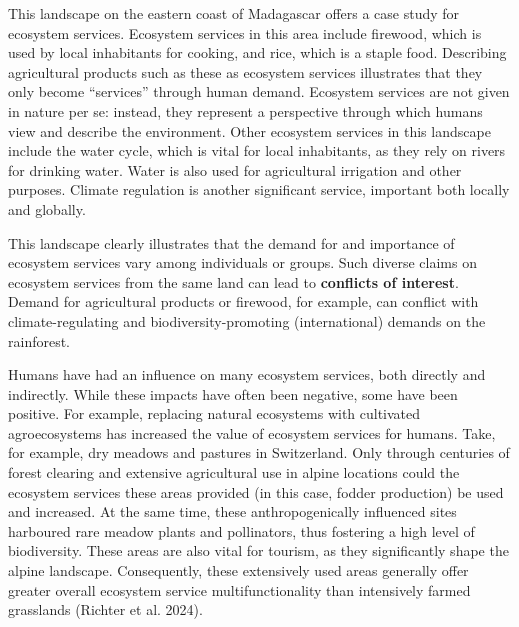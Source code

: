 \documentclass[
  a4paper,
  openany]{book}
\begin{document}
\begin{tcolorbox}[enhanced jigsaw, coltitle=black, bottomtitle=1mm, opacitybacktitle=0.6, titlerule=0mm, opacityback=0, leftrule=.75mm, colbacktitle=quarto-callout-tip-color!10!white, bottomrule=.15mm, toptitle=1mm, breakable, title={Case study: Ecosystem services in Madagascar}, arc=.35mm, rightrule=.15mm, toprule=.15mm, left=2mm, colback=white, colframe=quarto-callout-tip-color-frame]

This landscape on the eastern coast of Madagascar offers a case study
for ecosystem services. Ecosystem services in this area include
firewood, which is used by local inhabitants for cooking, and rice,
which is a staple food. Describing agricultural products such as these
as ecosystem services illustrates that they only become ``services''
through human demand. Ecosystem services are not given in nature per se:
instead, they represent a perspective through which humans view and
describe the environment. Other ecosystem services in this landscape
include the water cycle, which is vital for local inhabitants, as they
rely on rivers for drinking water. Water is also used for agricultural
irrigation and other purposes. Climate regulation is another significant
service, important both locally and globally.

This landscape clearly illustrates that the demand for and importance of
ecosystem services vary among individuals or groups. Such diverse claims
on ecosystem services from the same land can lead to \textbf{conflicts
of interest}. Demand for agricultural products or firewood, for example,
can conflict with climate-regulating and biodiversity-promoting
(international) demands on the rainforest.

\end{tcolorbox}

Humans have had an influence on many ecosystem services, both directly
and indirectly. While these impacts have often been negative, some have
been positive. For example, replacing natural ecosystems with cultivated
agroecosystems has increased the value of ecosystem services for humans.
Take, for example, dry meadows and pastures in Switzerland. Only through
centuries of forest clearing and extensive agricultural use in alpine
locations could the ecosystem services these areas provided (in this
case, fodder production) be used and increased. At the same time, these
anthropogenically influenced sites harboured rare meadow plants and
pollinators, thus fostering a high level of biodiversity. These areas
are also vital for tourism, as they significantly shape the alpine
landscape. Consequently, these extensively used areas generally offer
greater overall ecosystem service multifunctionality than intensively
farmed grasslands (Richter et al. 2024).
\end{document}
